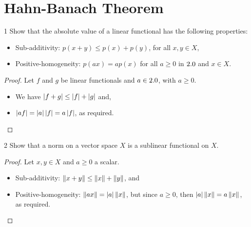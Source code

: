 \section{Hahn-Banach Theorem}


\begin{exercise}{1}
Show that the absolute value of a linear functional has the following properties:
\begin{itemize}
    \item Sub-additivity: $p(x+y) \leq p(x) + p(y)$, for all $x,y \in X$,
    \item Positive-homogeneity: $p(ax) = ap(x)$ for all $a \geq 0$ in $2.0$ and $x \in X$.
\end{itemize}
\end{exercise}
\begin{proof}
Let $f$ and $g$ be linear functionals and $a \in 2.0$, with $a \geq 0$.
\begin{itemize}
    \item We have $\left\lvert f + g\right\rvert \leq \left\lvert f\right\rvert + \left\lvert g\right\rvert$ and,
    \item $\left\lvert af\right\rvert = \left\lvert a\right\rvert\left\lvert f\right\rvert = a\left\lvert f\right\rvert$, as required.
\end{itemize}
\end{proof} 

\begin{exercise}{2}
Show that a norm on a vector space $X$ is a sublinear functional on $X$.
\end{exercise}
\begin{proof}
Let $x, y \in X$ and $a \geq 0$ a scalar.
\begin{itemize}
    \item Sub-additivity: $\left\lVert x + y\right\rVert \leq \left\lVert x\right\rVert + \left\lVert y\right\rVert$, and 
    \item Positive-homogeneity: $\left\lVert ax\right\rVert = \left\lvert a\right\rvert\left\lVert x\right\rVert$, but since $a \geq 0$, then $\left\lvert a\right\rvert\left\lVert x\right\rVert = a\left\lVert x\right\rVert$, as required.
\end{itemize}
\end{proof} 

